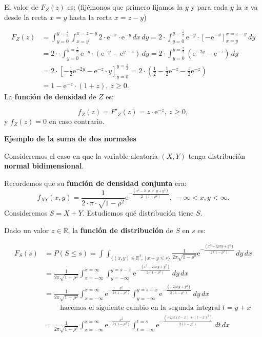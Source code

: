 \documentclass[
  letterpaper,
  DIV=11,
  numbers=noendperiod]{scrreprt}
\begin{document}
El valor de \(F_Z(z)\) es: (fijémonos que primero fijamos la \(y\) y
para cada \(y\) la \(x\) va desde la recta \(x=y\) hasta la recta
\(x=z-y\))

\[
\begin{array}{rl}
F_Z(z) & =\displaystyle\int_{y=0}^{y=\frac{z}{2}}\int_{x=y}^{x=z-y}2 \cdot\mathrm{e}^{-x}\cdot\mathrm{e}^{-y}\, dx\, dy = 2 \cdot\int_{y=0}^{y=\frac{z}{2}} \mathrm{e}^{-y} \cdot\left[-\mathrm{e}^{-x}\right]_{x=y}^{x=z-y}\, dy \\ & 
\displaystyle = 2 \cdot\cdot\int_{y=0}^{y=\frac{z}{2}} \mathrm{e}^{-y}\cdot \left(\mathrm{e}^{-y}-\mathrm{e}^{y-z}\right)\, dy = 2 \cdot\int_{y=0}^{y=\frac{z}{2}} \left(\mathrm{e}^{-2y}-\mathrm{e}^{-z} \right)\, dy  \\
& = 2\cdot\left[-\frac{1}{2}\mathrm{e}^{-2y}-\mathrm{e}^{-z} \cdot y\right]_{y=0}^{y=\frac{z}{2}}  = \displaystyle 2\cdot\left(\frac{1}{2}-\frac{1}{2}\mathrm{e}^{-z}-\frac{z}{2}\mathrm{e}^{-z}\right) \\ 
& = 1-\mathrm{e}^{-z}\cdot(1+z),\ z\geq 0.
\end{array}
\] La \textbf{función de densidad} de \(Z\) es:

\[
f_Z(z)=F'_Z(z)=z\cdot\mathrm{e}^{-z},\ z\geq 0,
\] y \(f_Z(z)=0\) en caso contrario.

\textbf{Ejemplo de la suma de dos normales}

Consideremos el caso en que la variable aleatoria \((X,Y)\) tenga
distribución \textbf{normal bidimensional}.

Recordemos que su \textbf{función de densidad conjunta} era: \[
f_{XY}(x,y)=\frac{1}{2\cdot \pi\cdot \sqrt{1-\rho^2}}\mathrm{e}^{-\frac{(x^2-2\cdot \rho\cdot  x\cdot y+y^2)}{2\cdot (1-\rho^2)}},\ -\infty <x,y<\infty.
\] Consideremos \(S=X+Y\). Estudiemos qué distribución tiene \(S\).

Dado un valor \(z\in\mathbb{R}\), la \textbf{función de distribución} de
\(S\) en \(s\) es:

\[
\begin{array}{rl}
F_S(s) & =P(S\leq s)=\displaystyle \int\int_{\{(x,y)\in\mathbb{R}^2,\ |\ x+y\leq s\}}\frac{1}{2\pi\sqrt{1-\rho^2}}\mathrm{e}^{-\frac{(x^2-2\rho xy+y^2)}{2(1-\rho^2)}}\, dy\, dx \\
& =\displaystyle  \frac{1}{2\pi\sqrt{1-\rho^2}} \int_{x=-\infty}^{x=\infty}\int_{y=-\infty}^{y=s-x}\mathrm{e}^{-\frac{(x^2-2\rho xy+y^2)}{2(1-\rho^2)}}\, dy\, dx \\
& = \displaystyle  \frac{1}{2\pi\sqrt{1-\rho^2}} \int_{x=-\infty}^{x=\infty} \mathrm{e}^{-\frac{x^2}{2(1-\rho^2)}} \int_{y=-\infty}^{y=s-x}\mathrm{e}^{-\frac{(-2\rho xy+y^2)}{2(1-\rho^2)}}\, dy\, dx  \\ &\ \qquad\mbox{hacemos el siguiente cambio  en la segunda integral $t=y+x$}\\
& = \displaystyle  \frac{1}{2\pi\sqrt{1-\rho^2}} \int_{x=-\infty}^{x=\infty} \mathrm{e}^{-\frac{x^2}{2(1-\rho^2)}} \int_{t=-\infty}^{t=s}\mathrm{e}^{-\frac{(-2\rho x(t-x)+(t-x)^2)}{2(1-\rho^2)}}\, dt\, dx 
\end{array}
\]
\end{document}
